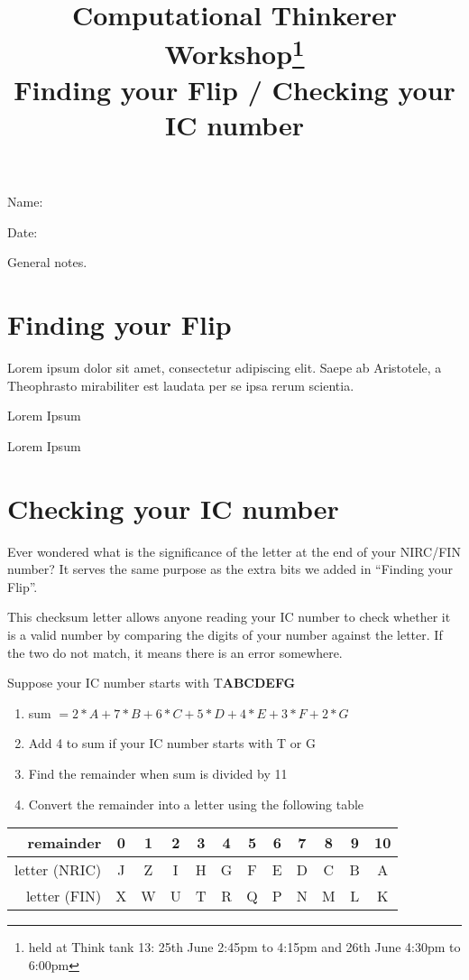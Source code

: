 \documentclass[a4paper,12pt]{article}
\title{Computational Thinkerer Workshop\footnote{held at Think tank 13: 25th June 2:45pm to 4:15pm and 26th June 4:30pm to 6:00pm}\\
Finding your Flip / Checking your IC number
\vspace{-2cm}}
\date{}
\newcommand\Blank[2][.33\linewidth]{%
  \rule{0pt}{4ex}%
  #2\enspace
  \makebox[#1]{\hrulefill}}
\begin{document}
\maketitle
\begin{flushright}
  \Blank{Name:}

  \Blank{Date:}
\end{flushright}

General notes.

\section{Finding your Flip}
Lorem ipsum dolor sit amet, consectetur adipiscing elit.   Saepe ab Aristotele,
a Theophrasto mirabiliter est laudata per se ipsa rerum scientia.

\begin{question}
Lorem Ipsum
\end{question}

\begin{question}
Lorem Ipsum
\end{question}

\newpage
\section{Checking your IC number}
Ever wondered what is the significance of the letter at the end of your NIRC/FIN
number? It serves the same purpose as the extra bits we added in
``Finding your Flip''.

This checksum letter allows anyone reading your IC number to check
whether it is a valid number by comparing the digits of your number against the
letter. If the two do not match, it means there is an error somewhere.

Suppose your IC number starts with T\textbf{ABCDEFG}
\begin{enumerate}
    \item sum $= 2 * A + 7 * B + 6 * C + 5 * D + 4 * E + 3 * F + 2 * G$
    \item Add 4 to sum if your IC number starts with T or G
    \item Find the remainder when sum is divided by 11
    \item Convert the remainder into a letter using the following table
\end{enumerate}

\begin{tabular}{r||ccccccccccc}
    remainder     & 0 & 1 & 2 & 3 & 4 & 5 & 6 & 7 & 8 & 9 & 10 \\ \hline
    letter (NRIC) & J & Z & I & H & G & F & E & D & C & B & A  \\
    letter (FIN)  & X & W & U & T & R & Q & P & N & M & L & K
\end{tabular}
\end{document}
